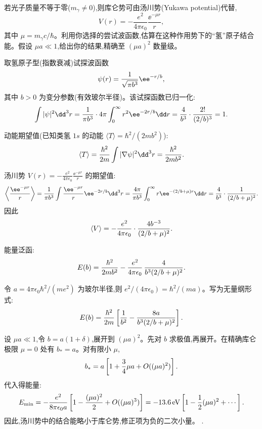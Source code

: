 \begin{question}
若光子质量不等于零($m_\gamma\ne0$),则库仑势可由汤川势(Yukawa potential)代替,
\[
V(r)=-\frac{e^2}{4\pi\epsilon_0}\frac{\ee^{-\mu r}}{r},
\]
其中 $\mu=m_\gamma c/\hbar$。利用你选择的尝试波函数,估算在这种作用势下的“氢”原子结合能。假设 $\mu a\ll1$,给出你的结果,精确至 $(\mu a)^2$ 数量级。
\end{question}
\begin{solution}
取氢原子型(指数衰减)试探波函数
\[
\psi(r)={1\over\sqrt{\pi b^3}}\ee^{-r/b},
\]
其中 $b>0$ 为变分参数(有效玻尔半径)。该试探函数已归一化:
\[
\int|\psi|^2\dd^3r={1\over\pi b^3}\cdot4\pi\int_0^\infty r^2 \ee^{-2r/b}\dd r
={4\over b^3}\cdot{2!\over(2/b)^3}=1.
\]

动能期望值(已知类氢 $1s$ 的动能 $\langle T\rangle=\hbar^2/(2mb^2)$):
\[
\langle T\rangle={\hbar^2\over2m}\int|\nabla\psi|^2\dd^3r={\hbar^2\over2mb^2}.
\]

汤川势 $V(r)=-\frac{e^2}{4\pi\epsilon_0}\frac{\ee^{-\mu r}}{r}$ 的期望值:
\[
\left\langle{\ee^{-\mu r}\over r}\right\rangle
={1\over\pi b^3}\int{\ee^{-\mu r}\over r}\ee^{-2r/b}\dd^3r
={4\pi\over\pi b^3}\int_0^\infty r \ee^{-(2/b+\mu)r}\dd r
={4\over b^3}\cdot{1\over(2/b+\mu)^2}.
\]
因此
\[
\langle V\rangle=-{e^2\over4\pi\epsilon_0}\cdot{4b^{-3}\over(2/b+\mu)^2}.
\]

能量泛函:
\[
E(b)={\hbar^2\over2mb^2}-{e^2\over4\pi\epsilon_0}\,{4\over b^3(2/b+\mu)^2}.
\]

令 $a=4\pi\epsilon_0\hbar^2/(me^2)$ 为玻尔半径,则 $e^2/(4\pi\epsilon_0)=\hbar^2/(ma)$。写为无量纲形式:
\[
E(b)={\hbar^2\over2m}\left[{1\over b^2}-{8a\over b^3(2/b+\mu)^2}\right].
\]

设 $\mu a\ll1$,令 $b=a(1+\delta)$,展开到 $(\mu a)^2$。先对 $b$ 求极值,再展开。在精确库仑极限 $\mu=0$ 处有 $b_*=a$。对有限小 $\mu$,
\[
b_*=a\left[1+{3\over4}\mu a+O((\mu a)^2)\right].
\]
代入得能量:
\[
E_{\min}=-{e^2\over8\pi\epsilon_0 a}\left[1-{(\mu a)^2\over2}+O((\mu a)^3)\right]
=-13.6\,\mathrm{eV}\left[1-{1\over2}(\mu a)^2+\cdots\right].
\]
因此,汤川势中的结合能略小于库仑势,修正项为负的二次小量。
.
\end{solution}

